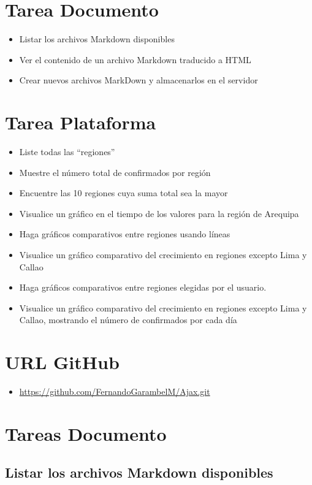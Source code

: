 \documentclass{article}
\begin{document}
	\clearpage




	\section{Tarea Documento}
	\begin{itemize}		
		\item Listar los archivos Markdown disponibles
		\item Ver el contenido de un archivo Markdown traducido a HTML
		\item Crear nuevos archivos MarkDown y almacenarlos en el servidor
	\end{itemize}
	\section{Tarea Plataforma}
	\begin{itemize}		
		\item Liste todas las “regiones”
		\item Muestre el número total de confirmados por región
		\item Encuentre las 10 regiones cuya suma total sea la mayor
		\item Visualice un gráfico en el tiempo de los valores para la región de Arequipa
		\item Haga gráficos comparativos entre regiones usando líneas
		\item Visualice un gráfico comparativo del crecimiento en regiones excepto Lima y Callao
		\item Haga gráficos comparativos entre regiones elegidas por el usuario.
		\item Visualice un gráfico comparativo del crecimiento en regiones excepto Lima y Callao, mostrando el número de confirmados por cada día
	\end{itemize}
	\section{URL GitHub}
	\begin{itemize}
		\item \url{https://github.com/FernandoGarambelM/Ajax.git}
	\end{itemize}
	\section{Tareas Documento}
	\subsection{Listar los archivos Markdown disponibles}
\end{document}
